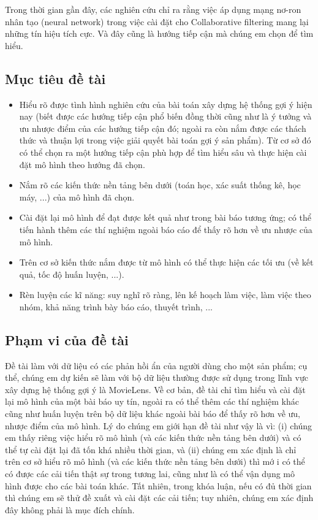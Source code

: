 \documentclass{article}[14pt]
\begin{document}
{      Trong thời gian gần đây, các nghiên cứu chỉ ra rằng việc áp dụng mạng 
      nơ-ron nhân tạo (neural network) trong việc cài đặt cho Collaborative filtering 
      mang lại những tín hiệu tích cực. 
      Và đây cũng là hướng tiếp cận mà chúng em chọn để tìm hiểu.
  
      \subsection{Mục tiêu đề tài}
      
  \begin{itemize}
  \item     Hiểu rõ được tình hình nghiên cứu của bài toán xây dựng hệ thống gợi ý
   hiện nay (biết được các hướng tiếp cận phổ biến đồng thời cũng như là ý tưởng 
   và ưu nhược điểm của các hướng tiếp cận đó; ngoài ra còn nắm được các 
   thách thức và thuận lợi trong việc giải quyết bài toán gợi ý sản phẩm). Từ cơ 
   sở đó có thể chọn ra một hướng tiếp cận phù hợp để tìm hiểu sâu và thực hiện 
   cài đặt mô hình theo hướng đã chọn.
  \item      Nắm rõ các kiến thức nền tảng bên dưới (toán học, xác suất thống kê, 
  học máy, ...) của mô hình đã chọn.
  \item     Cài đặt lại mô hình  để đạt được kết quả như trong bài báo tương ứng; 
  có thể tiến hành thêm các thí nghiệm ngoài báo cáo để thấy rõ hơn về ưu nhược 
  của mô hình.
  \item     Trên cơ sở kiến thức nắm được từ mô hình có thể thực hiện các tối ưu 
  (về kết quả, tốc độ huấn luyện, ...).
  \item     Rèn luyện các kĩ năng: suy nghĩ rõ ràng, lên kế hoạch làm việc, 
  làm việc theo nhóm, khả năng trình bày báo cáo, thuyết trình, ...
  \end{itemize}

    
    \subsection{Phạm vi của đề tài}
    
    Đề tài làm với dữ liệu có các phản hồi ẩn của người dùng cho một sản 
phẩm; cụ thể, chúng em dự kiến sẽ làm với bộ dữ liệu thường được sử  
dụng trong lĩnh vực xây dựng  hệ thống gợi ý là MovieLens.
    Về cơ bản, đề tài chỉ tìm hiểu và cài đặt lại mô hình của một bài báo uy 
tín, ngoài ra có thể thêm các thí nghiệm khác cũng như huấn luyện trên 
bộ dữ liệu khác ngoài bài báo để thấy rõ hơn về ưu, nhược điểm của mô 
hình.
    Lý do chúng em giới hạn đề tài như vậy là vì: (i) chúng em thấy riêng 
việc hiểu rõ mô hình (và các kiến thức nền tảng bên dưới) và có thể tự 
cài đặt lại đã tốn khá nhiều thời gian, và (ii) chúng em xác định là chỉ 
trên cơ sở hiểu rõ mô hình (và các kiến thức nền tảng bên dưới) thì mớ i 
có thể có được các cải tiến thật sự trong tương lai, cũng như là có thể 
vận dụng mô hình được cho các bài toán khác.
    Tất nhiên, trong khóa luận, nếu có đủ thời gian thì chúng em sẽ thử đề 
xuất và cài đặt các cải tiến; tuy nhiên, chúng em xác định đây không 
phải là mục đích chính.
    
}
\end{document}
